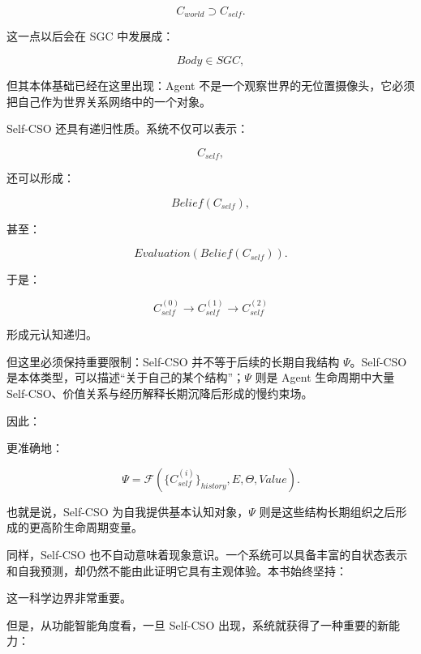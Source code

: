 \[
C_{world}
\supset
C_{self}.
\]

这一点以后会在 SGC 中发展成：

\[
Body\in SGC,
\]

但其本体基础已经在这里出现：Agent 不是一个观察世界的无位置摄像头，它必须把自己作为世界关系网络中的一个对象。

Self-CSO 还具有递归性质。系统不仅可以表示：

\[
C_{self},
\]

还可以形成：

\[
Belief(C_{self}),
\]

甚至：

\[
Evaluation
(
Belief(C_{self})
).
\]

于是：

\[
C_{self}^{(0)}
\rightarrow
C_{self}^{(1)}
\rightarrow
C_{self}^{(2)}
\]

形成元认知递归。

但这里必须保持重要限制：Self-CSO 并不等于后续的长期自我结构 \(\Psi\)。Self-CSO 是本体类型，可以描述“关于自己的某个结构”；\(\Psi\) 则是 Agent 生命周期中大量 Self-CSO、价值关系与经历解释长期沉降后形成的慢约束场。

因此：

\begin{statementbox}
\centering
{}
\end{statementbox}

更准确地：

\[
\Psi
=
\mathcal F
\left(
\{C_{self}^{(i)}\}_{history},
E,
\Theta,
Value
\right).
\]

也就是说，Self-CSO 为自我提供基本认知对象，\(\Psi\) 则是这些结构长期组织之后形成的更高阶生命周期变量。

同样，Self-CSO 也不自动意味着现象意识。一个系统可以具备丰富的自状态表示和自我预测，却仍然不能由此证明它具有主观体验。本书始终坚持：

\begin{statementbox}
\centering
{}
\end{statementbox}

这一科学边界非常重要。

但是，从功能智能角度看，一旦 Self-CSO 出现，系统就获得了一种重要的新能力：

\begin{statementbox}
\centering
{}
\end{statementbox}

